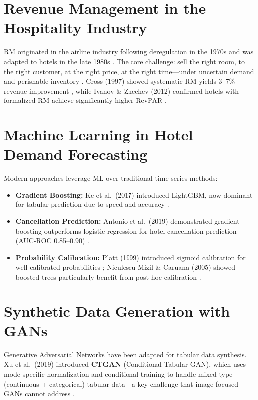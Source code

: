\documentclass[12pt,a4paper,openany]{report}
\begin{document}
\section{Revenue Management in the Hospitality Industry}

RM originated in the airline industry following deregulation in the 1970s and was adapted to hotels in the late 1980s \cite{talluri2004}. The core challenge: sell the right room, to the right customer, at the right price, at the right time---under uncertain demand and perishable inventory \cite{kimes1989}. Cross (1997) showed systematic RM yields 3--7\% revenue improvement \cite{cross1997}, while Ivanov \& Zhechev (2012) confirmed hotels with formalized RM achieve significantly higher RevPAR \cite{ivanov2012}.

\section{Machine Learning in Hotel Demand Forecasting}

Modern approaches leverage ML over traditional time series methods:

\begin{itemize}
  \item \textbf{Gradient Boosting:} Ke et al.\ (2017) introduced LightGBM, now dominant for tabular prediction due to speed and accuracy \cite{ke2017}.
  \item \textbf{Cancellation Prediction:} Antonio et al.\ (2019) demonstrated gradient boosting outperforms logistic regression for hotel cancellation prediction (AUC-ROC 0.85--0.90) \cite{antonio2019}.
  \item \textbf{Probability Calibration:} Platt (1999) introduced sigmoid calibration for well-calibrated probabilities \cite{platt1999}; Niculescu-Mizil \& Caruana (2005) showed boosted trees particularly benefit from post-hoc calibration \cite{niculescu2005}.
\end{itemize}

\section{Synthetic Data Generation with GANs}

Generative Adversarial Networks \cite{goodfellow2014} have been adapted for tabular data synthesis. Xu et al.\ (2019) introduced \textbf{CTGAN} (Conditional Tabular GAN), which uses mode-specific normalization and conditional training to handle mixed-type (continuous + categorical) tabular data---a key challenge that image-focused GANs cannot address \cite{xu2019}.
\end{document}
